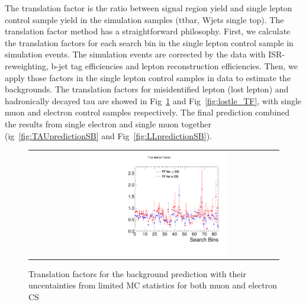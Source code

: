The translation factor is the ratio between signal region yield and single lepton control sample yield in the simulation samples (ttbar, Wjets single top). The translation factor method has a straightforward philosophy. First, we calculate the translation factors for each search bin in the single lepton control sample in simulation events. The simulation events are corrected by the data with ISR-reweighting, b-jet tag efficiencies and lepton reconstruction efficiencies. Then, we apply those factors in the single lepton control samples in data to estimate the backgrounds. The translation factors for misidentified lepton (lost lepton) and hadronically decayed tau are showed in Fig~\ref{fig:hadtau_TF} and Fig~\ref{fig:lostle_TF}, with single muon and electron control samples respectively. The final prediction combined the results from single electron and single muon together (ig~\ref{fig:TAUpredictionSB} and Fig~\ref{fig:LLpredictionSB}). 

\begin{figure}[htbp]
  \begin{center}
  \begin{tabular}{c}
  \includegraphics[angle=0,width=0.60\textwidth]{sections/mc4/Backgrounds/TF/figures/comp_TF_hadtau_comb.pdf}
  \end{tabular}
  \caption{Translation factors for the \tauh background prediction with their uncentainties from limited MC statistics for both muon and electron CS}
    \label{fig:hadtau_TF}
  \end{center}
\end{figure}


